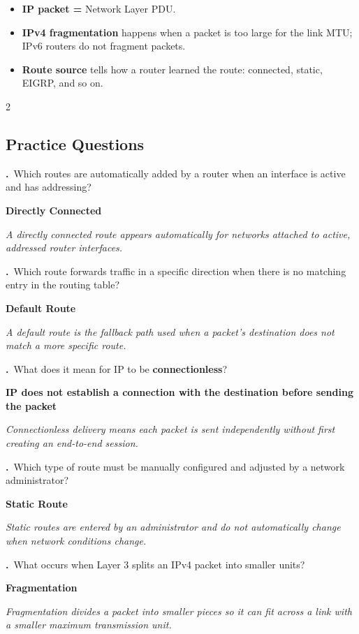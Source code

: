 \documentclass[9pt]{article}
\newcommand{\answer}[1]{%
  \par\nobreak\vspace{1pt}%
  \begin{tcolorbox}[
    colback=AnswerRed,
    colframe=AnswerRed,
    boxrule=0pt,
    arc=0pt,
    left=4pt, right=4pt,
    top=0.5pt, bottom=0.5pt,
    before skip=0pt,
    after skip=0pt
  ]
  {\footnotesize\bfseries\color{white}\RaggedRight #1}
  \end{tcolorbox}
}
\newcommand{\hl}[1]{\textbf{\textcolor{themeColor}{#1}}}
\newcommand{\explain}[1]{%
  \par\nobreak\vspace{0pt}%
  \begin{tcolorbox}[
    colback=LightBlueBg,
    colframe=SoftBlue!30,
    boxrule=0.3pt,
    arc=2pt,
    left=4pt, right=4pt,
    top=1pt, bottom=1pt,
    before skip=1pt,
    after skip=2pt
  ]
  {\footnotesize\color{MutedGray}\RaggedRight\itshape #1}
  \end{tcolorbox}
}
\newcounter{qnum}
\newcommand{\question}[1]{%
  \Needspace{4\baselineskip}%
  \stepcounter{qnum}%
  \par\vspace{3pt}%
  {\footnotesize\bfseries\color{themeColor}\theqnum.}\ {\footnotesize #1}%
}
\newcommand{\questioncolumns}[1]{%
  \begin{multicols}{2}
  \subsection*{Practice Questions}
  #1
  \end{multicols}
}
\begin{document}
{\begin{center}
\end{center}
\begin{itemize}[leftmargin=1em]
  \item \textbf{IP packet =} Network Layer PDU.
  \item \textbf{IPv4 fragmentation} happens when a packet is too large for the link MTU; IPv6 routers do not fragment packets.
  \item \textbf{Route source} tells how a router learned the route: connected, static, EIGRP, and so on.
\end{itemize}
}

\questioncolumns{
\question{Which routes are automatically added by a router when an interface is active and has addressing?}

\answer{Directly Connected}

\explain{A directly connected route appears automatically for networks attached to active, addressed router interfaces.}


\question{Which route forwards traffic in a specific direction when there is no matching entry in the routing table?}

\answer{Default Route}

\explain{A default route is the fallback path used when a packet's destination does not match a more specific route.}


\question{What does it mean for IP to be \hl{connectionless}?}

\answer{IP does not establish a connection with the destination before sending the packet}

\explain{Connectionless delivery means each packet is sent independently without first creating an end-to-end session.}


\question{Which type of route must be manually configured and adjusted by a network administrator?}

\answer{Static Route}

\explain{Static routes are entered by an administrator and do not automatically change when network conditions change.}


\question{What occurs when Layer 3 splits an IPv4 packet into smaller units?}

\answer{Fragmentation}

\explain{Fragmentation divides a packet into smaller pieces so it can fit across a link with a smaller maximum transmission unit.}


}
\end{document}
